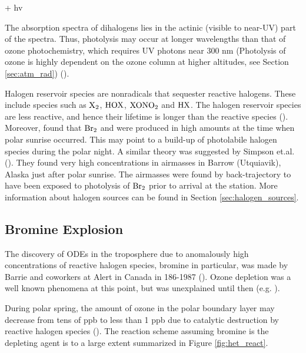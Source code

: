 \begin{reaction}
     + hv  
    \label{R:1}
\end{reaction}

The absorption spectra of dihalogens lies in the actinic (visible to near-UV) part of the spectra. Thus, photolysis may occur at longer wavelengths than that of ozone photochemistry, which requires UV photons near 300 nm (Photolysis of ozone is highly dependent on the ozone column at higher altitudes, see Section \ref{sec:atm_rad}) (\cite{Simpson2015}).

\medskip

Halogen reservoir species are nonradicals that sequester reactive halogens. These include species such as $\mathrm{X_2}$, $\mathrm{HOX}$, $\mathrm{XONO_2}$ and $\mathrm{HX}$. The halogen reservoir species are less reactive, and hence their lifetime is longer than the reactive species (\cite{Simpson2015}). Moreover, \cite{Foster2001} found that $\mathrm{Br_2}$ and  were produced in high amounts at the time when polar sunrise occurred. This may point to a build-up of photolabile halogen species during the polar night. A similar theory was suggested by Simpson et.al. (\cite{Simpson2018}). They found very high  concentrations in airmasses in Barrow (Utquiavik), Alaska just after polar sunrise. The airmasses were found by back-trajectory to have been exposed to photolysis of $\mathrm{Br_2}$ prior to arrival at the station. More information about halogen sources can be found in Section \ref{sec:halogen_sources}. 



\subsection{Bromine Explosion}\label{sec:BE}

The discovery of ODEs in the troposphere due to anomalously high concentrations of reactive halogen species, bromine in particular, was made by Barrie and coworkers at Alert in Canada in 186-1987 (\cite{BARRIE1986643}). Ozone depletion was a well known phenomena at this point, but was unexplained until then (e.g. \cite{Oltmans1981}). 

\medskip

During polar spring, the amount of ozone in the polar boundary layer may decrease from tens of ppb to less than 1 ppb due to catalytic destruction by reactive halogen species (\cite{CAO}). The reaction scheme assuming bromine is the depleting agent is to a large extent summarized in Figure \ref{fig:het_react}. 

